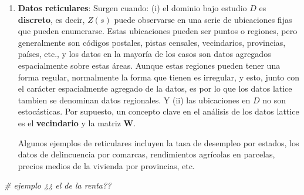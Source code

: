 \documentclass[
]{report}
\newenvironment{Shaded}{\begin{snugshade}}{\end{snugshade}}
\newcommand{\CommentTok}[1]{\textcolor[rgb]{0.56,0.35,0.01}{\textit{#1}}}
\begin{document}
\begin{enumerate}
\def\labelenumi{\arabic{enumi}.}
\setcounter{enumi}{1}
\item
  \textbf{Datos reticulares}: Surgen cuando: (i) el dominio bajo estudio \(D\) es
  \textbf{discreto}, es decir, \(Z(s)\) puede observarse en una serie de ubicaciones
  fijas que pueden enumerarse. Estas ubicaciones pueden ser puntos o regiones,
  pero generalmente son códigos postales, pistas censales, vecindarios,
  provincias, países, etc., y los datos en la mayoría de los casos son datos
  agregados espacialmente sobre estas áreas. Aunque estas regiones pueden
  tener una forma regular, normalmente la forma que tienen es irregular, y
  esto, junto con el carácter espacialmente agregado de la datos, es por lo
  que los datos latice tambien se denominan datos regionales. Y (ii) las
  ubicaciones en \(D\) no son estocásticas. Por supuesto, un concepto clave en
  el análisis de los datos lattice es el \textbf{vecindario} y la matriz \textbf{W}.

  Algunos ejemplos de reticulares incluyen la tasa de desempleo por estados,
  los datos de delincuencia por comarcas, rendimientos agrícolas en parcelas,
  precios medios de la vivienda por provincias, etc.
\end{enumerate}

\begin{Shaded}
\begin{Highlighting}[]
\CommentTok{\# ejemplo ¿¿ el de la renta??}
\end{Highlighting}
\end{Shaded}
\end{document}
